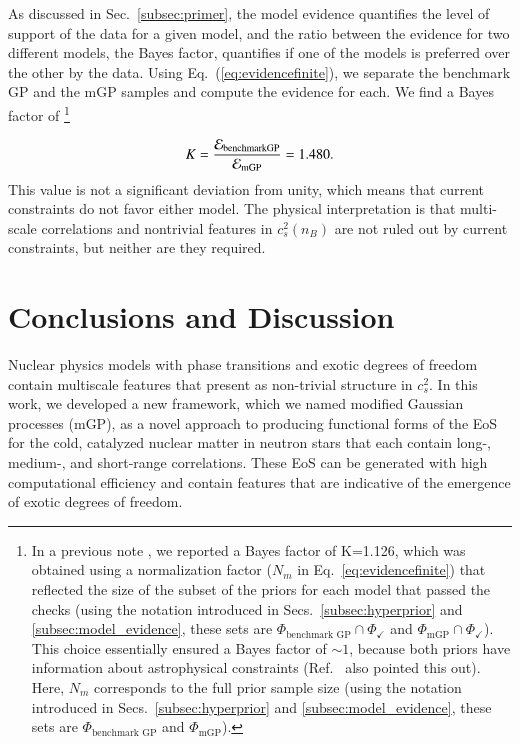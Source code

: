 \documentclass[aps,prd,nofootinbib,tightenlines,notitlepage,floatfix,superscriptaddress,showkeys,twocolumn]{revtex4-1}
\begin{document}
As discussed in Sec.~\ref{subsec:primer}, the model evidence quantifies the level of support of the data for a given model, and the ratio between the evidence for two different models, the Bayes factor, quantifies if one of the models is preferred over the other by the data. Using Eq.~(\ref{eq:evidencefinite}), we separate the benchmark GP and the mGP samples and compute the evidence for each. We find a Bayes factor of \footnote{In a previous note \cite{Mroczek:2023eff}, we reported a Bayes factor of K=1.126, which was obtained using a normalization factor ($N_{m}$ in Eq.~\ref{eq:evidencefinite}) that reflected the size of the subset of the priors for each model that passed the checks (using the notation introduced in Secs.~\ref{subsec:hyperprior} and \ref{subsec:model_evidence}, these sets are $\Phi_\textrm{benchmark GP}\cap\Phi_\checkmark$ and $\Phi_\textrm{mGP}\cap\Phi_\checkmark$). This choice essentially ensured a Bayes factor of $\sim 1$, because both priors have information about astrophysical constraints (Ref.~\cite{Essick:2023fso} also pointed this out). Here, $N_{m}$ corresponds to the full prior sample size (using the notation introduced in Secs.~\ref{subsec:hyperprior} and \ref{subsec:model_evidence}, these sets are $\Phi_\textrm{benchmark GP}$ and $\Phi_\textrm{mGP}$).}

\begin{equation}\label{eq:bayesfac}
    K = \dfrac{\mathcal{E}_{\rm benchmark GP}}{\mathcal{E}_{\rm mGP}} = 1.480.
\end{equation}
This value is not a significant deviation from unity, which means that current constraints do not favor either model. The physical interpretation is that multi-scale correlations and nontrivial features in $c_s^2(n_B)$ are not ruled out by current constraints, but neither are they required.  

\section{Conclusions and Discussion}\label{sec:conclu}

Nuclear physics models with phase transitions and exotic degrees of freedom contain multiscale features that present as non-trivial structure in $c_s^2$.  In this work, we developed a new framework, which we named modified Gaussian processes (mGP), as a novel approach to producing functional forms of the EoS for the cold, catalyzed nuclear matter in neutron stars that each contain long-, medium-, and short-range correlations. These EoS can be generated with high computational efficiency and contain features that are indicative of the emergence of exotic degrees of freedom. 
\end{document}
